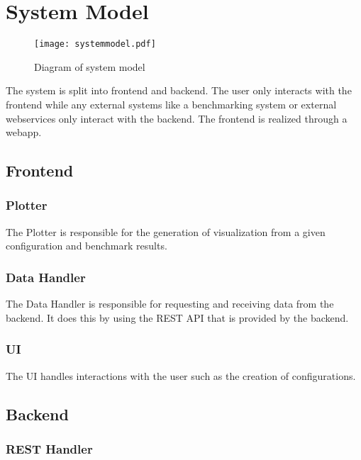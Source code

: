 \section{System Model}

\begin{figure}[H]
    \texttt{[image: systemmodel.pdf]}
    \caption{Diagram of system model}
    \label{fig:systemmodel}
\end{figure}

The system is split into frontend and backend. The \gls{user} only interacts with the frontend while any external systems like a benchmarking system or external webservices only interact with the backend. The frontend is realized through a webapp.

\subsection{Frontend}

\subsubsection*{Plotter}

The Plotter is responsible for the generation of \gls{visualization} from a given \gls{configuration} and benchmark results. 

\subsubsection*{Data Handler}

The Data Handler is responsible for requesting and receiving data from the backend. It does this by using the \gls{REST API} that is provided by the backend.

\subsubsection*{UI}

The UI handles interactions with the \gls{user} such as the creation of \glspl{configuration}.

\subsection{Backend}

\subsubsection*{REST Handler}

